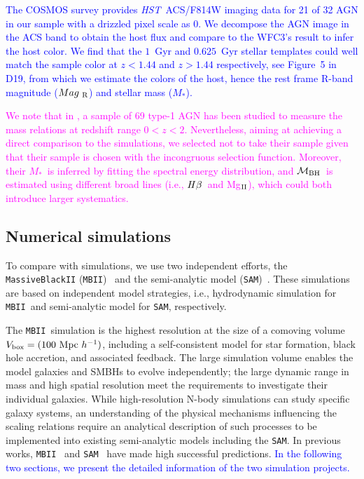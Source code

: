 \documentclass[twocolumn,trackchanges]{aastex63}
\newcommand{\hst}{{\it HST}}
\newcommand{\mbh}{$\mathcal M_{\rm BH}$}
\newcommand{\mr}{$Mag_{\rm ~R}$}
\newcommand{\hbeta}{${\it H}\beta$}
\newcommand{\mstar}{{$M_*$}}
\newcommand{\Mgii}{Mg$_{\rm II}$}
\newcommand{\sam}{\texttt{SAM}}
\newcommand{\mbii}{\texttt{MBII}}
\newcommand{\blue}[1]{{ \textcolor{blue}{#1}}}
\newcommand{\pink}[1]{{ \textcolor{magenta}{#1}}}
\begin{document}
\blue{The COSMOS survey provides \hst\ ACS/F814W imaging data for 21 of 32 AGN in our sample with a drizzled pixel scale as 0\farcs03. We decompose the AGN image in the ACS band to obtain the host flux and compare to the WFC3's result to infer the host color. We find that the $1$~Gyr and $0.625$~Gyr stellar templates could well match the sample color at $z<1.44$ and $z>1.44$ respectively, see Figure~5 in D19, from which we estimate the colors of the host, hence the rest frame R-band magnitude (\mr) and stellar mass (\mstar).}

\pink{We note that in \citet{Sun2015}, a sample of 69 type-1 AGN has been studied to measure the mass relations at redshift range $0<z<2$. Nevertheless, aiming at achieving a direct comparison to the simulations, we selected not to take their sample given that their sample is chosen with the incongruous selection function. Moreover, their \mstar\ is inferred by fitting the spectral energy distribution, and \mbh\ is estimated using different broad lines (i.e., \hbeta\ and \Mgii), which could both introduce larger systematics.}

\subsection{Numerical simulations}\label{sample_sim}
To compare with simulations, we use two independent efforts, the \texttt{MassiveBlackII} (\texttt{MBII})~\citep{Khandai2015} and the semi-analytic model (\texttt{SAM})~\citep{Menci2014}. These simulations are based on independent model strategies, i.e., hydrodynamic simulation for \mbii\ and semi-analytic model for \sam, respectively.

The \mbii\ simulation is the highest resolution at the size of a comoving volume $V_{\rm box} = (100~{\rm Mpc}~h^{-1})$, including a self-consistent model for star formation, black hole accretion, and associated feedback. The large simulation volume enables the model galaxies and SMBHs to evolve independently; the large dynamic range in mass and high spatial resolution meet the requirements to investigate their individual galaxies. While high-resolution N-body simulations can study specific galaxy systems, an understanding of the physical mechanisms influencing the scaling relations require an analytical description of such processes to be implemented into existing semi-analytic models including the \sam. In previous works, \mbii~\citep{Huang2018, DeG++15, Khandai2015,Bhowmick2019} and \sam~\citep{Menci2014, Menci2016} have made high successful predictions. \blue{In the following two sections, we present the detailed information of the two simulation projects.}
\end{document}
